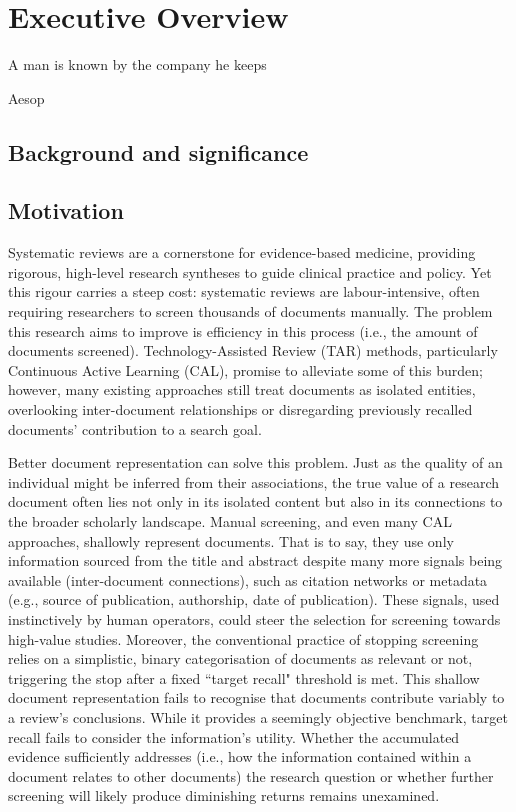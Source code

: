 \documentclass[10pt,oneside]{book}
\begin{document}
\newpage
\chapter{Executive Overview}

\epigraph{A man is known by the company he keeps}{Aesop}

\section{Background and significance}
\section{Motivation}
Systematic reviews are a cornerstone for evidence-based medicine, providing rigorous, high-level research syntheses to guide clinical practice and policy. Yet this rigour carries a steep cost: systematic reviews are labour-intensive, often requiring researchers to screen thousands of documents manually. The problem this research aims to improve is efficiency in this process (i.e., the amount of documents screened). Technology-Assisted Review (TAR) methods, particularly Continuous Active Learning (CAL), promise to alleviate some of this burden; however, many existing approaches still treat documents as isolated entities, overlooking inter-document relationships or disregarding previously recalled documents' contribution to a search goal.

Better document representation can solve this problem. Just as the quality of an individual might be inferred from their associations, the true value of a research document often lies not only in its isolated content but also in its connections to the broader scholarly landscape. Manual screening, and even many CAL approaches, shallowly represent documents. That is to say, they use only information sourced from the title and abstract despite many more signals being available (inter-document connections), such as citation networks or metadata (e.g., source of publication, authorship, date of publication). These signals, used instinctively by human operators, could steer the selection for screening towards high-value studies. Moreover, the conventional practice of stopping screening relies on a simplistic, binary categorisation of documents as relevant or not, triggering the stop after a fixed ``target recall" threshold is met. This shallow document representation fails to recognise that documents contribute variably to a review's conclusions. While it provides a seemingly objective benchmark, target recall fails to consider the information's utility. Whether the accumulated evidence sufficiently addresses (i.e., how the information contained within a document relates to other documents) the research question or whether further screening will likely produce diminishing returns remains unexamined. 
\end{document}
